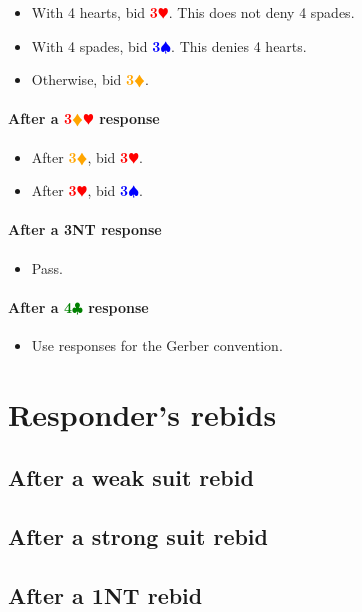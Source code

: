 \documentclass{article}
\newcommand{\Hs}{\textcolor{Red}{$\varheart$}}
\newcommand{\Ss}{\textcolor{Blue}{$\spadesuit$}}
\newcommand{\Ds}{\textcolor{Orange}{$\vardiamond$}}
\newcommand{\Cs}{\textcolor{Green}{$\clubsuit$}}
\newcommand{\NTs}{\textbf{\footnotesize{NT}}}
\renewcommand{\H}[1]{\textcolor{Red}{\textbf{#1}\Hs}}
\renewcommand{\S}[1]{\textcolor{Blue}{\textbf{#1}\Ss}}
\newcommand{\D}[1]{\textcolor{Orange}{\textbf{#1}\Ds}}
\newcommand{\C}[1]{\textcolor{Green}{\textbf{#1}\Cs}}
\newcommand{\NT}[1]{\textbf{#1\NTs}}
\newcommand{\reds}[1]{\textcolor{Red}{\textbf{#1}}\Ds\Hs}
\begin{document}
\begin{itemize}
\item With 4 hearts, bid \H{3}. This does not deny 4 spades.
\item With 4 spades, bid \S{3}. This denies 4 hearts.
\item Otherwise, bid \D{3}.
\end{itemize}

\paragraph{After a \reds{3} response}

\begin{itemize}
\item After \D{3}, bid \H{3}.
\item After \H{3}, bid \S{3}.
\end{itemize}

\paragraph{After a \NT{3} response}

\begin{itemize}
\item Pass.
\end{itemize}

\paragraph{After a \C{4} response}

\begin{itemize}
\item Use responses for the Gerber convention.
\end{itemize}

\section{Responder's rebids}

\subsection{After a weak suit rebid}

\subsection{After a strong suit rebid}

\subsection{After a \NT{1} rebid}
\end{document}
